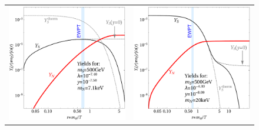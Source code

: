 \begin{figure}[t!]
\begin{tabular}{cc}
 \hspace{-1cm}\includegraphics[width=7.9cm]{figures/yield500FIMP.pdf} & \includegraphics[width=7.9cm]{figures/yield500WIMP.pdf}\\

\end{tabular}
\end{figure}
